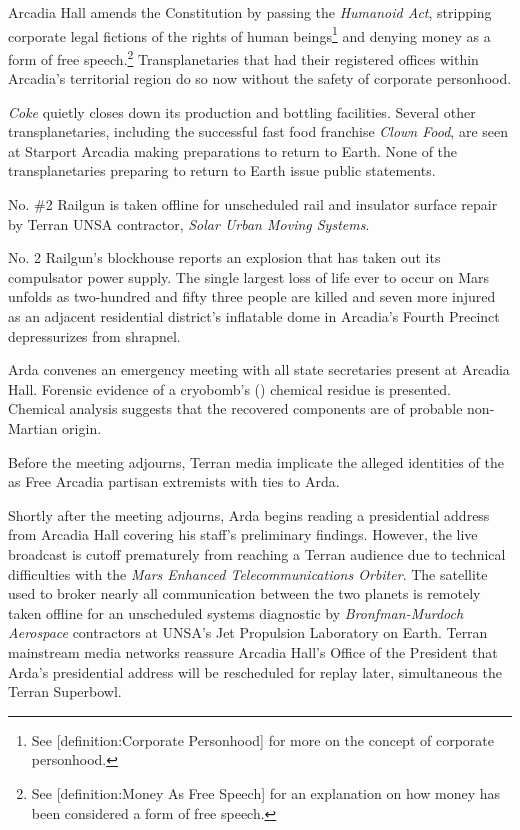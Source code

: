 Arcadia Hall amends the Constitution by passing the {\it Humanoid Act}, stripping corporate legal fictions of the rights of human beings\footnote{See [definition:Corporate Personhood] for more on the concept of corporate personhood.} and denying money as a form of free speech.\footnote{See [definition:Money As Free Speech] for an explanation on how money has been considered a form of free speech.} Transplanetaries that had their registered offices within Arcadia's territorial region do so now without the safety of corporate personhood.
\StopTimelineDate

{\it Coke} quietly closes down its production and bottling facilities. Several other transplanetaries, including the successful fast food franchise {\it Clown Food}, are seen at Starport Arcadia making preparations to return to Earth. None of the transplanetaries preparing to return to Earth issue public statements.
\StopTimelineDate

No. \#2 Railgun is taken offline for unscheduled rail and insulator surface repair by Terran UNSA contractor, {\it Solar Urban Moving Systems}.
\StopTimelineDate

No. \type{#}2 Railgun's blockhouse reports an explosion that has taken out its compulsator power supply. The single largest loss of life ever to occur on Mars unfolds as two-hundred and fifty three people are killed and seven more injured as an adjacent residential district's inflatable dome in Arcadia's Fourth Precinct depressurizes from shrapnel.

Arda convenes an emergency meeting with all state secretaries present at Arcadia Hall. Forensic evidence of a cryobomb's () chemical residue is presented. Chemical analysis suggests that the recovered components are of probable non-Martian origin. 

Before the meeting adjourns, Terran media implicate the alleged identities of the  as Free Arcadia partisan extremists with ties to Arda.

Shortly after the meeting adjourns, Arda begins reading a presidential address from Arcadia Hall covering his staff's preliminary findings. However, the live broadcast is cutoff prematurely from reaching a Terran audience due to technical difficulties with the {\it Mars Enhanced Telecommunications Orbiter}. The satellite used to broker nearly all communication between the two planets is remotely taken offline for an unscheduled systems diagnostic by {\it Bronfman-Murdoch Aerospace} contractors at UNSA's Jet Propulsion Laboratory on Earth. Terran mainstream media networks reassure Arcadia Hall's Office of the President that Arda's presidential address will be rescheduled for replay later, simultaneous the Terran Superbowl.

